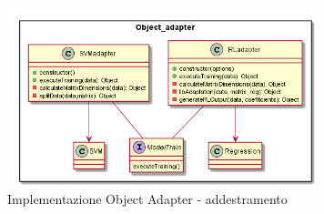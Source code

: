 \documentclass[../manuale-sviluppatore.tex]{subfiles}
\begin{document}
\begin{figure}[h]
    \begin{center}
         \includegraphics[width=9cm]{img/objectAdapterTA.png}
         \caption{Implementazione Object Adapter - addestramento}
         \label{fig:object_adapter}
     \end{center}
 \end{figure}
\end{document}
